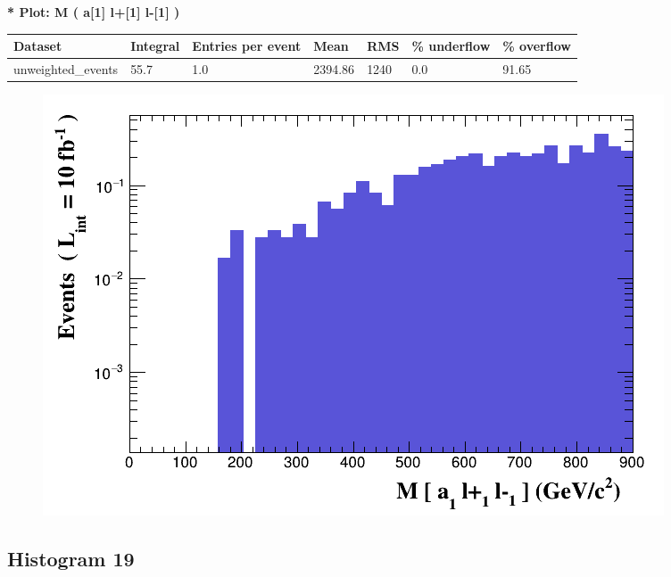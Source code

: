 \documentclass[a4paper, 10pt]{article}
\begin{document}
\textbf{* Plot: M ( a[1] l+[1] l-[1] ) }\\
   \begin{table}[H]
  \begin{center}
    \begin{tabular}{|m{23.0mm}|m{23.0mm}|m{18.0mm}|m{19.0mm}|m{19.0mm}|m{19.0mm}|m{19.0mm}|}
      \hline
      {\cellcolor{yellow}         Dataset}& {\cellcolor{yellow}         Integral}& {\cellcolor{yellow}         Entries per event}& {\cellcolor{yellow}         Mean}& {\cellcolor{yellow}         RMS}& {\cellcolor{yellow}         \% underflow}& {\cellcolor{yellow}         \% overflow}\\
      \hline
      {\cellcolor{white}         unweighted\_events}& {\cellcolor{white}         55.7}& {\cellcolor{white}         1.0}& {\cellcolor{white}         2394.86}& {\cellcolor{white}         1240}& {\cellcolor{red}         0.0}& {\cellcolor{red}         91.65}\\
\hline
    \end{tabular}
  \end{center}
\end{table}

\begin{figure}[H]
  \begin{center}
    \includegraphics[scale=0.45]{selection_17.png}\\
\caption{   }
  \end{center}
\end{figure}
      \newpage
\subsection{ Histogram 19}
\end{document}
